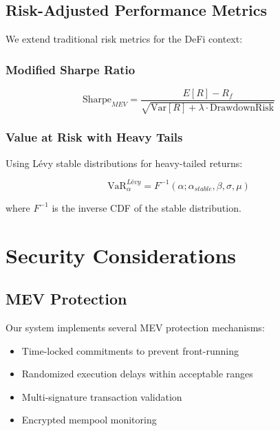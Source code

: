 \documentclass[12pt]{article}
\begin{document}
\subsection{Risk-Adjusted Performance Metrics}

We extend traditional risk metrics for the DeFi context:

\subsubsection{Modified Sharpe Ratio}

\begin{equation}
\text{Sharpe}_{MEV} = \frac{E[R] - R_f}{\sqrt{\text{Var}[R] + \lambda \cdot \text{DrawdownRisk}}}
\end{equation}

\subsubsection{Value at Risk with Heavy Tails}

Using Lévy stable distributions for heavy-tailed returns:

\begin{equation}
\text{VaR}_\alpha^{Lévy} = F^{-1}(\alpha; \alpha_{stable}, \beta, \sigma, \mu)
\end{equation}

where $F^{-1}$ is the inverse CDF of the stable distribution.

\section{Security Considerations}

\subsection{MEV Protection}

Our system implements several MEV protection mechanisms:

\begin{itemize}
    \item Time-locked commitments to prevent front-running
    \item Randomized execution delays within acceptable ranges
    \item Multi-signature transaction validation
    \item Encrypted mempool monitoring
\end{itemize}
\end{document}
